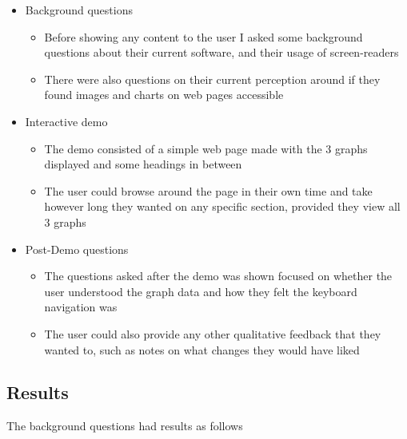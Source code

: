 \documentclass[ %
                    author={Aleena Baig},
                supervisor={Dr Simon Lock},
                    degree={BSc},
                     title={On Making Web Accessible Graphs},
                  subtitle={},
                      year={2019} ]{dissertation}
\begin{document}
\begin{itemize}
    \item Background questions
    \begin{itemize}
        \item Before showing any content to the user I asked some background questions about their current software, and their usage of screen-readers
        \item There were also questions on their current perception around if they found images and charts on web pages accessible
    \end{itemize}
    \item Interactive demo
    \begin{itemize}
        \item The demo consisted of a simple web page made with the 3 graphs displayed and some headings in between
        \item The user could browse around the page in their own time and take however long they wanted on any specific section, provided they view all 3 graphs
    \end{itemize}
    \item Post-Demo questions
    \begin{itemize}
        \item The questions asked after the demo was shown focused on whether the user understood the graph data and how they felt the keyboard navigation was
        \item The user could also provide any other qualitative feedback that they wanted to, such as notes on what changes they would have liked
    \end{itemize}
\end{itemize}

\subsection{Results}

The background questions had results as follows
\end{document}
